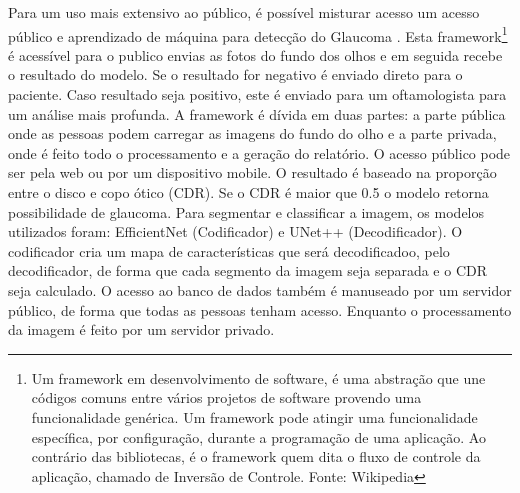 \documentclass[ %
	msc, %
	portugues %
]{../ppgccufmg}
\begin{document}
    Para um uso mais extensivo ao público, é possível misturar acesso um acesso público e aprendizado
    de máquina para detecção do Glaucoma \citep{Garg2022}.
    Esta framework\footnote{Um framework em desenvolvimento de software, é uma abstração que une
    códigos comuns entre vários projetos de software provendo uma funcionalidade genérica. Um
    framework pode atingir uma funcionalidade específica, por configuração, durante a programação de
    uma aplicação. Ao contrário das bibliotecas, é o framework quem dita o fluxo de controle da
    aplicação, chamado de Inversão de Controle. Fonte: Wikipedia} é acessível para o publico envias as fotos do fundo dos olhos e em seguida recebe o
    resultado do modelo. Se o resultado for negativo é enviado direto para o paciente. Caso
    resultado seja positivo, este é enviado para um oftamologista para um análise mais profunda. A
    framework é dívida em duas partes: a parte pública onde as pessoas podem carregar as imagens do
    fundo do olho e a parte privada, onde é feito todo o processamento e a geração do relatório. O
    acesso público pode ser pela web ou por um dispositivo mobile.  O resultado é baseado na
    proporção entre o disco e copo ótico (CDR). Se o CDR é maior que 0.5 o modelo retorna
    possibilidade de glaucoma. Para segmentar e classificar a imagem, os modelos utilizados foram:
    EfficientNet \citep{efficientnet} (Codificador) e UNet++
    \citep{DBLP:journals/corr/abs-1807-10165} (Decodificador). O codificador cria um mapa de
    características que será decodificadoo, pelo decodificador, de forma que cada segmento da imagem seja separada e
    o CDR seja calculado. O acesso ao banco de dados também é manuseado por um servidor público, de
    forma que todas as pessoas tenham acesso. Enquanto o processamento da imagem é feito por um
    servidor privado.
\end{document}
